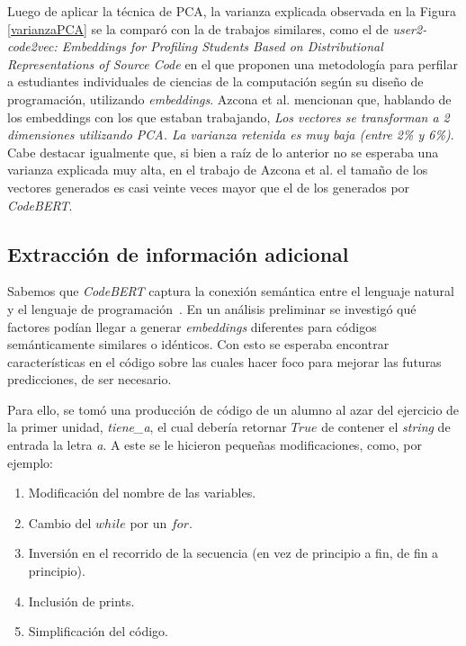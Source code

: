 \documentclass[11pt,a4paper,twoside,openany]{tesis}
\begin{document}
Luego de aplicar la técnica de PCA, la varianza explicada observada en la Figura \ref{varianzaPCA} se la comparó con la de trabajos similares, como el de \emph{user2-code2vec: Embeddings for Profiling Students Based on Distributional Representations of Source Code} \cite{user2code} en el que proponen una metodología para perfilar a estudiantes individuales de ciencias de la computación según su diseño de programación, utilizando \emph{embeddings}. Azcona et al. mencionan que, hablando de los embeddings con los que estaban trabajando, \emph{Los vectores se transforman a 2 dimensiones utilizando PCA. La varianza retenida es muy baja (entre 2\% y 6\%)}. Cabe destacar igualmente que, si bien a raíz de lo anterior no se esperaba una varianza explicada muy alta, en el trabajo de Azcona et al. el tamaño de los vectores generados es casi veinte veces mayor que el de los generados por \emph{CodeBERT}.

\subsection{Extracción de información adicional}\label{subsec:extraccion}

Sabemos que \emph{CodeBERT} captura la conexión semántica entre el lenguaje natural y el lenguaje de programación~\cite{codeBert}. En un análisis preliminar se investigó qué factores podían llegar a generar \emph{embeddings} diferentes para códigos semánticamente similares o idénticos. Con esto se esperaba encontrar características en el código sobre las cuales hacer foco para mejorar las futuras predicciones, de ser necesario. 

Para ello, se tomó una producción de código de un alumno al azar del ejercicio de la primer unidad, \emph{tiene\_a}, el cual debería retornar $True$ de contener el \emph{string} de entrada la letra \emph{a}. A este se le hicieron pequeñas modificaciones, como, por ejemplo:
\begin{enumerate}
    \item Modificación del nombre de las variables.
    \item Cambio del $while$ por un $for$.
    \item Inversión en el recorrido de la secuencia (en vez de principio a fin, de fin a principio).
    \item Inclusión de prints.
    \item Simplificación del código.
\end{enumerate}
\end{document}

